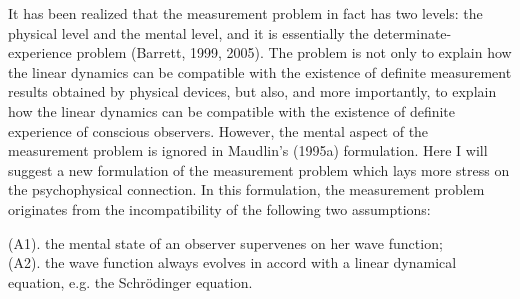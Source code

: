 

It has been realized that the measurement problem in fact has two levels: the physical level and the mental level, and it is essentially the determinate-experience problem (Barrett, 1999, 2005). 
The problem is not only to explain how the linear dynamics can be compatible with the existence of  definite measurement results obtained by physical devices, but also, and more importantly,  to explain how the linear dynamics can be compatible with the existence of definite experience of conscious observers. 
However, the mental aspect of the measurement problem is ignored in Maudlin's (1995a) formulation. 
Here I will suggest a new formulation of the measurement problem which lays more stress on the psychophysical connection. In this formulation, the measurement problem originates from the incompatibility of the following two assumptions:

(A1). the mental state of an observer supervenes on her wave function; \\ %
\indent (A2). the wave function always evolves in accord with a linear dynamical equation, e.g. the Schr\"{o}dinger equation. \\

